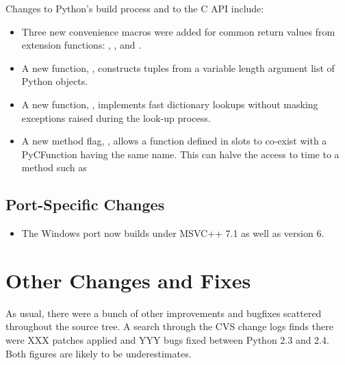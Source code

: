 \documentclass{howto}
\begin{document}
Changes to Python's build process and to the C API include:

\begin{itemize}

  \item Three new convenience macros were added for common return
  values from extension functions: ,
  , and .

  \item A new function, , constructs tuples from a variable
  length argument list of Python objects.

  \item A new function, ,
  implements fast dictionary lookups without masking exceptions raised
  during the look-up process.

  \item A new method flag, , allows a function
  defined in slots to co-exist with a PyCFunction having the same name.
  This can halve the access to time to a method such as

\end{itemize}


\subsection{Port-Specific Changes}

\begin{itemize}

\item The Windows port now builds under MSVC++ 7.1 as well as version 6.

\end{itemize}


\section{Other Changes and Fixes \label{section-other}}

As usual, there were a bunch of other improvements and bugfixes
scattered throughout the source tree.  A search through the CVS change
logs finds there were XXX patches applied and YYY bugs fixed between
Python 2.3 and 2.4.  Both figures are likely to be underestimates.
\end{document}

